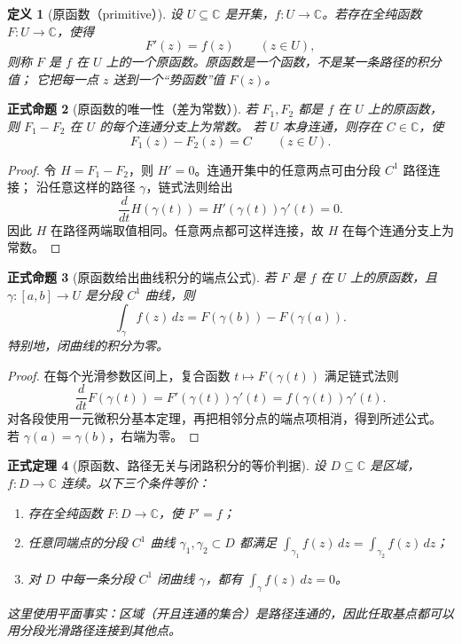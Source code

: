 \documentclass[UTF8,fontset=none,a4paper,11pt]{ctexart}
\theoremstyle{foundation-definition}
\newtheorem{definition}{定义}[section]
\theoremstyle{foundation-theorem}
\newtheorem{theorem}[definition]{正式定理}
\theoremstyle{foundation-proposition}
\newtheorem{proposition}[definition]{正式命题}
\theoremstyle{foundation-example}
\theoremstyle{foundation-remark}
\theoremstyle{foundation-theorem}
\begin{document}
\begin{definition}[原函数（primitive）]\label{def:primitive-complex}
设 \(U\subseteq\mathbb C\) 是开集，\(f:U\to\mathbb C\)。若存在全纯函数
\(F:U\to\mathbb C\)，使得
\[
 F'(z)=f(z)\qquad(z\in U),
\]
则称 \(F\) 是 \(f\) 在 \(U\) 上的一个原函数。原函数是一个函数，不是某一条路径的积分值；
它把每一点 \(z\) 送到一个“势函数”值 \(F(z)\)。
\end{definition}

\begin{proposition}[原函数的唯一性（差为常数）]\label{prop:primitive-uniqueness}
若 \(F_1,F_2\) 都是 \(f\) 在 \(U\) 上的原函数，则 \(F_1-F_2\) 在 \(U\) 的每个连通分支上为常数。
若 \(U\) 本身连通，则存在 \(C\in\mathbb C\)，使
\[
F_1(z)-F_2(z)=C\qquad(z\in U).
\]
\end{proposition}

\begin{proof}
令 \(H=F_1-F_2\)，则 \(H'=0\)。连通开集中的任意两点可由分段 \(C^1\) 路径连接；
沿任意这样的路径 \(\gamma\)，链式法则给出
\[
\frac{d}{dt}H(\gamma(t))=H'(\gamma(t))\gamma'(t)=0.
\]
因此 \(H\) 在路径两端取值相同。任意两点都可这样连接，故 \(H\) 在每个连通分支上为常数。
\end{proof}

\begin{proposition}[原函数给出曲线积分的端点公式]\label{prop:primitive-path-integral}
若 \(F\) 是 \(f\) 在 \(U\) 上的原函数，且 \(\gamma:[a,b]\to U\) 是分段 \(C^1\) 曲线，则
\[
 \int_\gamma f(z)\,dz
 =F(\gamma(b))-F(\gamma(a)).
\]
特别地，闭曲线的积分为零。
\end{proposition}

\begin{proof}
在每个光滑参数区间上，复合函数 \(t\mapsto F(\gamma(t))\) 满足链式法则
\[
 \frac{d}{dt}F(\gamma(t))=F'(\gamma(t))\gamma'(t)
 =f(\gamma(t))\gamma'(t).
\]
对各段使用一元微积分基本定理，再把相邻分点的端点项相消，得到所述公式。
若 \(\gamma(a)=\gamma(b)\)，右端为零。
\end{proof}

\begin{theorem}[原函数、路径无关与闭路积分的等价判据]\label{thm:primitive-path-independence}
设 \(D\subseteq\mathbb C\) 是区域，\(f:D\to\mathbb C\) 连续。以下三个条件等价：
\begin{enumerate}[label=\textup{(\alph*)}]
  \item 存在全纯函数 \(F:D\to\mathbb C\)，使 \(F'=f\)；
  \item 任意同端点的分段 \(C^1\) 曲线 \(\gamma_1,\gamma_2\subset D\) 都满足
  \(\displaystyle\int_{\gamma_1}f(z)\,dz=\int_{\gamma_2}f(z)\,dz\)；
  \item 对 \(D\) 中每一条分段 \(C^1\) 闭曲线 \(\gamma\)，都有
  \(\displaystyle\int_\gamma f(z)\,dz=0\)。
\end{enumerate}
这里使用平面事实：区域（开且连通的集合）是路径连通的，因此任取基点都可以用分段光滑路径连接到其他点。
\end{theorem}
\end{document}
